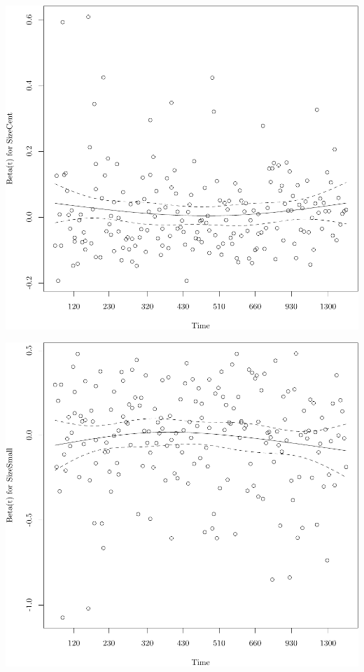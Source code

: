 \documentclass{article}\usepackage[]{graphicx}\usepackage[]{color}
\makeatletter
\def\maxwidth{ %
  \ifdim\Gin@nat@width>\linewidth
    \linewidth
  \else
    \Gin@nat@width
  \fi
}
\newenvironment{knitrout}{}{} %
\makeatother
\begin{document}
\begin{knitrout}
{\centering \includegraphics[width=\maxwidth]{figure/05-eda-ph-check-full-3-4} 

}




{\centering \includegraphics[width=\maxwidth]{figure/05-eda-ph-check-full-3-5} 

}





\end{knitrout}
\end{document}
